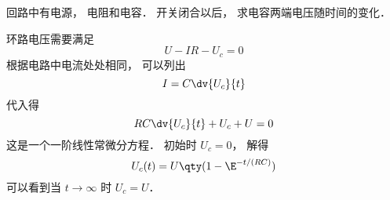 
\begin{issues}
\issueDraft
\end{issues}


回路中有电源， 电阻和电容． 开关闭合以后， 求电容两端电压随时间的变化．

环路电压需要满足
\begin{equation}
U - IR - U_c = 0
\end{equation}
根据电路中电流处处相同， 可以列出
\begin{equation}
I = C\dv{U_c}{t}
\end{equation}
代入得
\begin{equation}
RC\dv{U_c}{t} + U_c + U = 0
\end{equation}
这是一个一阶线性常微分方程． 初始时 $U_c = 0$， 解得
\begin{equation}
U_c(t) = U\qty(1 - \E^{-t/(RC)})
\end{equation}
可以看到当 $t \to \infty$ 时 $U_c = U$．

